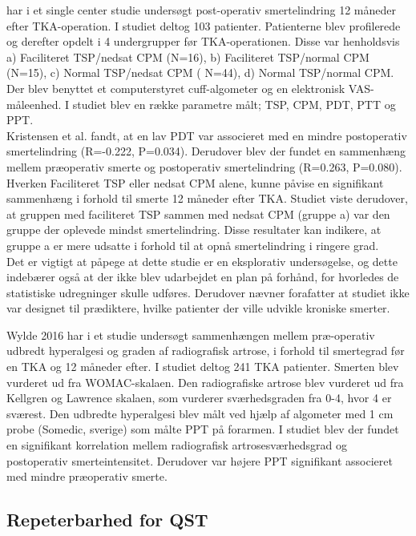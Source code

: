  har i et single center  studie undersøgt post-operativ smertelindring 12 måneder efter TKA-operation. I studiet deltog 103 patienter. Patienterne blev profilerede og derefter opdelt i 4 undergrupper før TKA-operationen. Disse var henholdsvis a)  Faciliteret TSP/nedsat CPM (N=16), b) Faciliteret TSP/normal CPM (N=15), c)  Normal TSP/nedsat CPM ( N=44), d) Normal TSP/normal CPM. Der blev benyttet et computerstyret cuff-algometer og en elektronisk VAS-måleenhed. I studiet blev en række parametre målt; TSP, CPM, PDT, PTT og PPT. \\
Kristensen et al. fandt, at en lav PDT var associeret med en mindre postoperativ smertelindring (R=-0.222, P=0.034). Derudover blev der fundet en sammenhæng mellem præoperativ smerte og postoperativ smertelindring (R=0.263, P=0.080).
Hverken Faciliteret TSP eller nedsat CPM alene, kunne påvise en signifikant sammenhæng i forhold til smerte 12 måneder efter TKA. Studiet viste derudover, at gruppen med faciliteret TSP sammen med nedsat CPM (gruppe a) var den gruppe der oplevede mindst smertelindring.
Disse resultater kan indikere, at gruppe a er mere udsatte i forhold til at opnå smertelindring i ringere grad.\\
Det er vigtigt at påpege at dette studie er en eksplorativ undersøgelse, og dette indebærer også at der ikke blev udarbejdet en plan på forhånd, for hvorledes de statistiske udregninger skulle udføres.
Derudover nævner forafatter at studiet ikke  var designet til prædiktere, hvilke patienter der ville udvikle kroniske smerter.


Wylde 2016 har i et studie undersøgt sammenhængen mellem præ-operativ udbredt hyperalgesi og graden af radiografisk artrose, i forhold til smertegrad før en TKA og 12 måneder efter. I studiet deltog 241 TKA patienter. Smerten blev vurderet ud fra WOMAC-skalaen. Den radiografiske artrose blev vurderet ud fra Kellgren og Lawrence skalaen, som vurderer sværhedsgraden fra 0-4, hvor 4 er sværest. Den udbredte hyperalgesi blev målt ved hjælp af algometer med 1 cm probe (Somedic, sverige) som målte PPT på forarmen.
I studiet blev der fundet en signifikant korrelation mellem radiografisk artrosesværhedsgrad og postoperativ smerteintensitet. Derudover var højere PPT signifikant associeret med mindre præoperativ smerte.	


\subsection{Repeterbarhed for QST}
